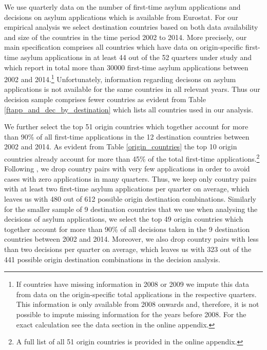 \documentclass[a4paper,12pt]{article}
\begin{document}
We use quarterly data on the number of first-time asylum applications and decisions on asylum applications which is available from Eurostat. For our empirical analysis we select destination countries based on both data availability and size of the countries in the time period 2002 to 2014. More precisely, our main specification comprises all countries which have data on origin-specific first-time asylum applications in at least 44 out of the 52 quarters under study and which report in total more than 30000 first-time asylum applications between 2002 and 2014.\footnote{If countries have missing information in 2008 or 2009 we impute this data from data on the origin-specific total applications in the respective quarters. This information is only available from 2008 onwards and, therefore, it is not possible to impute missing information for the years before 2008. For the exact calculation see the data section in the online appendix.} Unfortunately, information regarding decisons on asylum applications is not available for the same countries in all relevant years. Thus our decision sample comprises fewer countries as evident from Table \ref{ftapp_and_dec_by_destination} which lists all countries used in our analysis.



We further select the top 51 origin countries which together account for more than 90\% of all first-time applications in the 12 destination countries between 2002 and 2014. As evident from Table \ref{origin_countries} the top 10 origin countries already account for more than 45\% of the total first-time applications.\footnote{A full list of all 51 origin countries is provided in the online appendix.} Following \cite{hatton2016}, we drop country pairs with very few applications in order to avoid cases with zero applications in many quarters. Thus, we keep only country pairs with at least two first-time asylum applications per quarter on average, which leaves us with 480 out of 612 possible origin destination combinations. Similarly for the smaller sample of 9 destination countries that we use when analysing the decisions of asylum applications, we select the top 49 origin countries which together account for more than 90\% of all decisions taken in the 9 destination countries between 2002 and 2014. Moreover, we also drop country pairs with less than two decisions per quarter on average, which leaves us with 323 out of the 441 possible origin destination combinations in the decision analysis.
\end{document}
